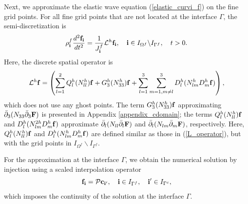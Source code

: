 Next, we approximate the elastic wave equation (\ref{elastic_curvi_f}) on the fine grid points. For all fine grid points that are not located at the interface $\Gamma$, the semi-discretization  is
\begin{equation}\label{elastic_semi_f}
{\rho}_{\bf i}^{f}\frac{d^2{{\bf f}_{\bf i}}}{dt^2} = \frac{1}{J^f_{\bf i}}{\mathcal{L}}^{h} {{\bf f}}_{\bf i},\quad {\bf i}\in I_{\Omega^f}\backslash I_{{\Gamma^f}},\quad t>0.
\end{equation}
Here, the discrete spatial operator is
\begin{equation}\label{Lf_operator}
{\mathcal{L}}^{h} {{\bf f}} = \left(\sum_{l=1}^2{Q}_l^{h}({N}_{ll}^h){\bf f}+{G}_3^{h}({N}_{33}^h){\bf f}+\sum_{l=1}^3\sum_{m=1,m\neq l}^3{D}_l^{h}({N}_{lm}^{h}{D}_m^{h}{\bf f})\right),
\end{equation}
which does not use any ghost points. The term ${G}_3^{h}(N_{33}^{h}){\bf f}$ approximating $\bar{\partial}_3(N_{33}\bar{\partial}_3 {\bf F})$ is presented in Appendix \ref{appendix_cdomain}; the terms $Q_l^{h}(N_{ll}^{h}){\bf f}$ and $D_{l}^{h}(N_{lm}^{2h}D_m^{h}{\bf f})$ approximate $\bar{\partial}_l(N_{ll}\bar{\partial}_l{\bf F})$ and $\bar{\partial}_l(N_{lm}\bar{\partial}_m {\bf F})$, respectively. Here, ${Q}_l^{h}({N}_{ll}^h){\bf f}$ and ${D}_l^{h}({N}_{lm}^{h}{D}_m^{h}{\bf f})$ are defined similar as those in (\ref{L_operator}), but with the grid points in $I_{\Omega^f}\backslash I_{{\Gamma^f}}$.

For the approximation at the interface $\Gamma$, we obtain the numerical solution by injection using a scaled interpolation operator
\begin{equation}\label{continuous_sol}
{\bf f}_{\bf i} = {\mathcal{P}}{\bf c}_{{\bf i}'},\quad {\bf i}\in I_{\Gamma^f},\quad {{\bf i}'}\in I_{\Gamma^c},
\end{equation}
which imposes the continuity of the solution at the interface $\Gamma$. 


